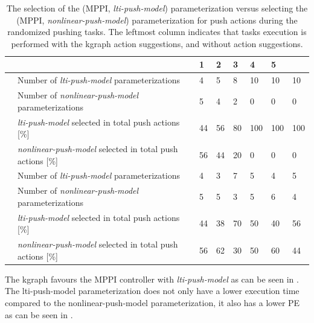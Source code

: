 \begin{table}[H]
    \caption{The selection of the (\ac{MPPI}, \textit{lti-push-model}) parameterization versus selecting the (\ac{MPPI}, \textit{nonlinear-push-model}) parameterization for push actions during the randomized pushing tasks. The leftmost column indicates that tasks execution is performed with the \ac{kgraph} action suggestions, and without action suggestions.}
    \label{table:rand_push_model1_vs_model2}
    \centering
    \begin{tabular}%
      {
        >{\raggedright\arraybackslash}p{}
        >{\raggedright\arraybackslash}p{}
      |p{0.4cm}p{0.4cm}p{0.4cm}p{0.4cm}p{0.4cm}p{0.4cm}}
      \multicolumn{2}{c|}{Number of Tasks in experience} &0&1&2&3&4&5\\\toprule
      \multirow{4}{0.1\textwidth}{With \ac{kgraph} suggestions} 
      &Number of \textit{lti-push-model} parameterizations&4&5&8&10&10&10\\
      &Number of \textit{nonlinear-push-model} parameterizations&5&4&2&0&0&0\\
      & \textit{lti-push-model} selected in total push actions [\%]&44&56&80&100&100&100\\
      & \textit{nonlinear-push-model} selected in total push actions [\%]&56&44&20&0&0&0\\\midrule
      \multirow{4}{0.1\textwidth}{Without \ac{kgraph} suggestions} 
      &Number of \textit{lti-push-model} parameterizations&4&3&7&5&4&5\\
      &Number of \textit{nonlinear-push-model} parameterizations&5&5&3&5&6&4\\
      & \textit{lti-push-model} selected in total push actions [\%]&44&38&70&50&40&56\\
      & \textit{nonlinear-push-model} selected in total push actions [\%]&56&62&30&50&60&44\\
    \end{tabular}
\end{table}


The \ac{kgraph} favours the \ac{MPPI} controller with \textit{lti-push-model} as can be seen in . The lti-push-model parameterization does not only have a lower execution time compared to the nonlinear-push-model parameterization, it also has a lower \ac{PE} as can be seen in .

